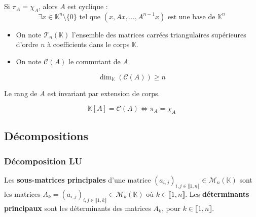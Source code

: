 	\begin{lemma}
		Si $\pi_A = \chi_A$, alors $A$ est cyclique :
		\[ \exists x \in \mathbb{K}^n \setminus \{ 0 \} \text{ tel que } (x, Ax, \dots, A^{n-1}x) \text{ est une base de } \mathbb{K}^n \]
	\end{lemma}
	
	
	\begin{notation}
		\begin{itemize}
			\item On note $\mathcal{T}_n(\mathbb{K})$ l'ensemble des matrices carrées triangulaires supérieures d'ordre $n$ à coefficients dans le corps $\mathbb{K}$.
			\item On note $\mathcal{C}(A)$ le commutant de $A$.
		\end{itemize}
	\end{notation}
	
	\begin{lemma}
		\[ \dim_{\mathbb{K}}(\mathcal{C}(A)) \geq n \]
	\end{lemma}
	
	\begin{lemma}
		Le rang de $A$ est invariant par extension de corps.
	\end{lemma}
	
	
	\begin{theorem}
		\[ \mathbb{K}[A] = \mathcal{C}(A) \iff \pi_A = \chi_A \]
	\end{theorem}
	
	\subsection{Décompositions}
	
	\subsubsection{Décomposition LU}
	
	
	\begin{definition}
		Les \textbf{sous-matrices principales} d'une matrice $(a_{i,j})_{i,j \in \llbracket 1, n \rrbracket} \in \mathcal{M}_n(\mathbb{K})$ sont les matrices $A_k = (a_{i,j})_{i,j \in \llbracket 1, k \rrbracket} \in \mathcal{M}_k(\mathbb{K})$ où $k \in \llbracket 1, n \rrbracket$. Les \textbf{déterminants principaux} sont les déterminants des matrices $A_k$, pour $k \in \llbracket 1, n \rrbracket$.
	\end{definition}
	
